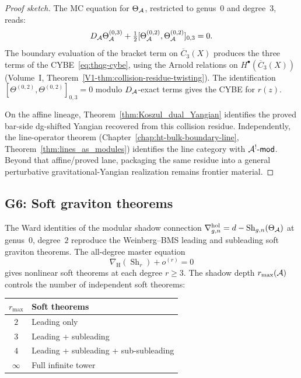 \begin{proof}[Proof sketch]
The MC equation for $\Theta_{\mathcal{A}}$, restricted to genus~$0$ and degree~$3$,
reads:
\[
D_{\mathcal{A}} \Theta_{\mathcal{A}}^{(0,3)}
+ \tfrac{1}{2}[\Theta_{\mathcal{A}}^{(0,2)}, \Theta_{\mathcal{A}}^{(0,2)}]_{0,3} = 0.
\]
The boundary evaluation of the bracket term on $\overline{C}_3(X)$
produces the three terms of the CYBE~\eqref{eq:thqg-cybe}, using the
Arnold relations on $H^\bullet(\overline{C}_3(X))$
(Volume~I, Theorem~\ref{V1-thm:collision-residue-twisting}). The
identification $[\Theta^{(0,2)}, \Theta^{(0,2)}]_{0,3} = 0$
modulo $D_{\mathcal{A}}$-exact terms gives the CYBE for $r(z)$.

On the affine lineage, Theorem~\ref{thm:Koszul_dual_Yangian}
identifies the proved bar-side dg-shifted Yangian recovered from this
collision residue. Independently, the line-operator theorem
(Chapter~\ref{chap:ht-bulk-boundary-line},
Theorem~\ref{thm:lines_as_modules}) identifies the line category
with $\mathcal{A}^!\text{-}\mathsf{mod}$. Beyond that affine/proved lane,
packaging the same residue into a general perturbative
gravitational-Yangian realization remains frontier material.
\end{proof}


\subsection{G6: Soft graviton theorems}

\begin{theorem}
The Ward identities of the modular shadow connection
$\nabla^{\mathrm{hol}}_{g,n} = d - \operatorname{Sh}_{g,n}(\Theta_{\mathcal{A}})$
at genus~$0$, degree~$2$ reproduce the Weinberg--BMS leading and subleading
soft graviton theorems. The all-degree master equation
\begin{equation}%
\nabla_{\mathrm{H}}(\operatorname{Sh}_r) + o^{(r)} = 0
\end{equation}
gives nonlinear soft theorems at each degree $r \ge 3$. The shadow depth
$r_{\max}(\mathcal{A})$ controls the number of independent soft theorems:
\begin{center}
\renewcommand{\arraystretch}{1.1}
\small
\begin{tabular}{cl}
$r_{\max}$ & Soft theorems \\
\hline
$2$ & Leading only \\
$3$ & Leading + subleading \\
$4$ & Leading + subleading + sub-subleading \\
$\infty$ & Full infinite tower
\end{tabular}
\end{center}
\end{theorem}

